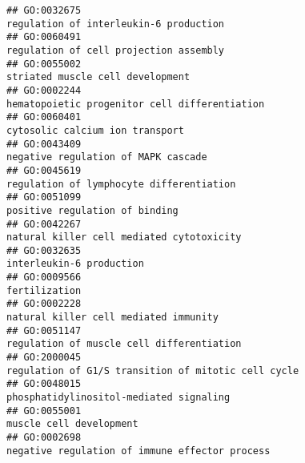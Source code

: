 \documentclass[
]{article}
\begin{document}
\begin{verbatim}
## GO:0032675                                                                                                           regulation of interleukin-6 production
## GO:0060491                                                                                                           regulation of cell projection assembly
## GO:0055002                                                                                                                 striated muscle cell development
## GO:0002244                                                                                                    hematopoietic progenitor cell differentiation
## GO:0060401                                                                                                                  cytosolic calcium ion transport
## GO:0043409                                                                                                              negative regulation of MAPK cascade
## GO:0045619                                                                                                         regulation of lymphocyte differentiation
## GO:0051099                                                                                                                   positive regulation of binding
## GO:0042267                                                                                                        natural killer cell mediated cytotoxicity
## GO:0032635                                                                                                                         interleukin-6 production
## GO:0009566                                                                                                                                    fertilization
## GO:0002228                                                                                                            natural killer cell mediated immunity
## GO:0051147                                                                                                        regulation of muscle cell differentiation
## GO:2000045                                                                                              regulation of G1/S transition of mitotic cell cycle
## GO:0048015                                                                                                          phosphatidylinositol-mediated signaling
## GO:0055001                                                                                                                          muscle cell development
## GO:0002698                                                                                                   negative regulation of immune effector process

\end{verbatim}
\end{document}
